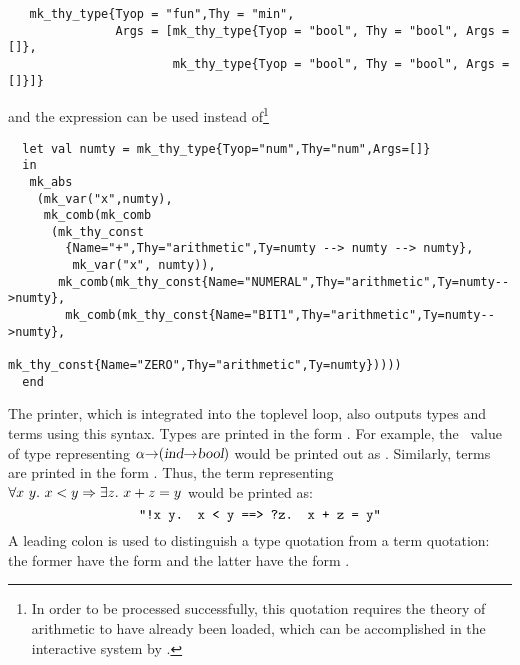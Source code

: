 \begin{hol}
\begin{verbatim}
   mk_thy_type{Tyop = "fun",Thy = "min",
               Args = [mk_thy_type{Tyop = "bool", Thy = "bool", Args = []},
                       mk_thy_type{Tyop = "bool", Thy = "bool", Args = []}]}
\end{verbatim}
\end{hol}

\noindent and the expression 
%
%
can be used instead of\footnote{In order to be processed successfully,
  this quotation requires the theory of arithmetic to have already
  been loaded, which can be accomplished in the interactive system by
  .}

\begin{hol}
\begin{verbatim}
  let val numty = mk_thy_type{Tyop="num",Thy="num",Args=[]}
  in
   mk_abs
    (mk_var("x",numty),
     mk_comb(mk_comb
      (mk_thy_const
        {Name="+",Thy="arithmetic",Ty=numty --> numty --> numty},
         mk_var("x", numty)),
       mk_comb(mk_thy_const{Name="NUMERAL",Thy="arithmetic",Ty=numty-->numty},
        mk_comb(mk_thy_const{Name="BIT1",Thy="arithmetic",Ty=numty-->numty},
                mk_thy_const{Name="ZERO",Thy="arithmetic",Ty=numty}))))
  end
\end{verbatim}
\end{hol}

The \HOL{} printer, which is integrated into the \ML{} toplevel loop,
also outputs types and terms using this syntax.
%
%
Types are printed
%
%
in the form . For example, the \ML\ value
of type  representing
$\alpha{\to}(\textsl{ind}{\to}\textsl{bool})$ would be printed out
as .
Similarly, terms are printed in the form .
Thus, the term representing $\forall x\ y.\ x<y \Rightarrow\exists z.\ x+z = y$
would be printed as:
%
\[ \holquote{\ml{!x y. x < y ==> ?z. x + z = y}} \]
%
A leading colon is used to distinguish a type quotation from a term quotation:
the former have the form \holquote{\ml{:}~$\cdots$~} and the latter have
the form \holquote{~$\cdots$~}.

